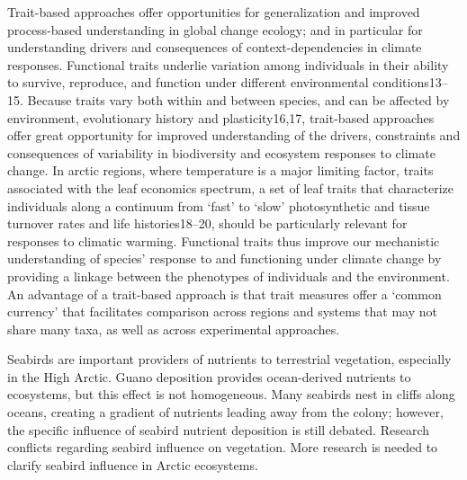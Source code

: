 \documentclass[a4paper]{article}
\begin{document}
Trait-based approaches offer opportunities for generalization and improved process-based understanding in global change ecology; and in particular for understanding drivers and consequences of context-dependencies in climate responses.
Functional traits underlie variation among individuals in their ability to survive, reproduce, and function under different environmental conditions13--15.
Because traits vary both within and between species, and can be affected by environment, evolutionary history and plasticity16,17, trait-based approaches offer great opportunity for improved understanding of the drivers, constraints and consequences of variability in biodiversity and ecosystem responses to climate change.
In arctic regions, where temperature is a major limiting factor, traits associated with the leaf economics spectrum, a set of leaf traits that characterize individuals along a continuum from `fast' to `slow' photosynthetic and tissue turnover rates and life histories18--20, should be particularly relevant for responses to climatic warming.
Functional traits thus improve our mechanistic understanding of species' response to and functioning under climate change by providing a linkage between the phenotypes of individuals and the environment.
An advantage of a trait-based approach is that trait measures offer a `common currency' that facilitates comparison across regions and systems that may not share many taxa, as well as across experimental approaches.

Seabirds are important providers of nutrients to terrestrial vegetation, especially in the High Arctic.
Guano deposition provides ocean-derived nutrients to ecosystems, but this effect is not homogeneous.
Many seabirds nest in cliffs along oceans, creating a gradient of nutrients leading away from the colony; however, the specific influence of seabird nutrient deposition is still debated.
Research conflicts regarding seabird influence on vegetation. More research is needed to clarify seabird influence in Arctic ecosystems.
\end{document}
